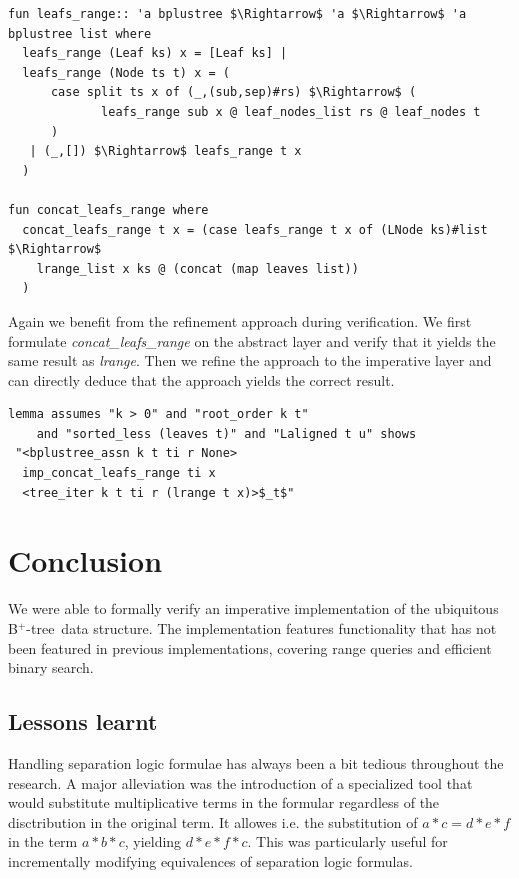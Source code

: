 \documentclass[a4paper,UKenglish,cleveref, autoref, thm-restate]{lipics-v2021}
\newcommand{\btree}{B$^+$-tree}
\begin{document}
\begin{lstlisting}[mathescape=true, language=Isabelle,label=lst:btree-leafs-range]
fun leafs_range:: 'a bplustree $\Rightarrow$ 'a $\Rightarrow$ 'a bplustree list where
  leafs_range (Leaf ks) x = [Leaf ks] |
  leafs_range (Node ts t) x = (
      case split ts x of (_,(sub,sep)#rs) $\Rightarrow$ (
             leafs_range sub x @ leaf_nodes_list rs @ leaf_nodes t
      )
   | (_,[]) $\Rightarrow$ leafs_range t x
  )

fun concat_leafs_range where
  concat_leafs_range t x = (case leafs_range t x of (LNode ks)#list $\Rightarrow$
    lrange_list x ks @ (concat (map leaves list))
  )
\end{lstlisting}

Again we benefit from the refinement approach during verification.
We first formulate \emph{concat\_leafs\_range} on the abstract layer
and verify that it yields the same result as \emph{lrange}.
Then we refine the approach to the imperative layer
and can directly deduce that the approach yields the correct result.

\begin{lstlisting}[mathescape=true, language=Isabelle,label=lst:btree-leafs-range]
lemma assumes "k > 0" and "root_order k t" 
    and "sorted_less (leaves t)" and "Laligned t u" shows 
 "<bplustree_assn k t ti r None>
  imp_concat_leafs_range ti x
  <tree_iter k t ti r (lrange t x)>$_t$"
\end{lstlisting}



\section{Conclusion}
\label{sec:conclusion}

We were able to formally verify an imperative implementation
of the ubiquitous \btree\ data structure.
The implementation features functionality that has not been 
featured in previous implementations,
covering range queries and efficient binary search.

\subsection{Lessons learnt}

Handling separation logic formulae has always been
a bit tedious throughout the research.
A major alleviation was the introduction of a specialized tool
that would substitute multiplicative terms in the formular
regardless of the disctribution in the original term.
It allowes i.e. the substitution of $a * c = d * e * f$ in
the term $a * b * c$, yielding $d * e * f * c$.
This was particularly useful for incrementally
modifying equivalences of separation logic formulas.
\end{document}
